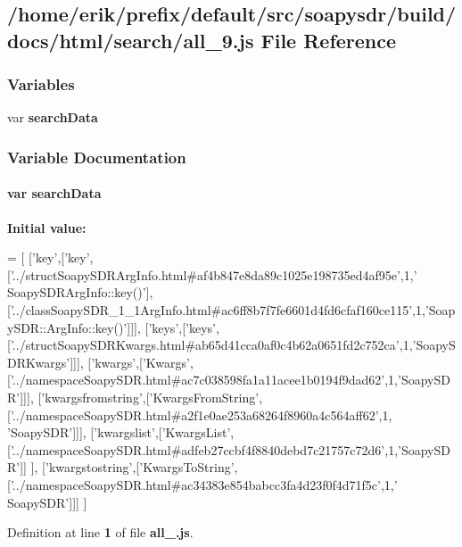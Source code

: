 \subsection{/home/erik/prefix/default/src/soapysdr/build/docs/html/search/all\+\_\+9.js File Reference}
\label{all__9_8js}
\subsubsection*{Variables}
\begin{DoxyCompactItemize}
\item 
var {\bf search\+Data}
\end{DoxyCompactItemize}


\subsubsection{Variable Documentation}
\paragraph[{search\+Data}]{\setlength{\rightskip}{0pt plus 5cm}var search\+Data}\label{all__9_8js_ad01a7523f103d6242ef9b0451861231e}
{\bfseries Initial value\+:}
\begin{DoxyCode}
=
[
  [\textcolor{stringliteral}{'key'},[\textcolor{stringliteral}{'key'},[\textcolor{stringliteral}{'../structSoapySDRArgInfo.html#af4b847e8da89c1025e198735ed4af95e'},1,\textcolor{stringliteral}{'
      SoapySDRArgInfo::key()'}],[\textcolor{stringliteral}{'../classSoapySDR\_1\_1ArgInfo.html#ac6ff8b7f7fe6601d4fd6cfaf160ce115'},1,\textcolor{stringliteral}{'SoapySDR::ArgInfo::key()'}]]],
  [\textcolor{stringliteral}{'keys'},[\textcolor{stringliteral}{'keys'},[\textcolor{stringliteral}{'../structSoapySDRKwargs.html#ab65d41cca0af0c4b62a0651fd2c752ca'},1,\textcolor{stringliteral}{'SoapySDRKwargs'}]]],
  [\textcolor{stringliteral}{'kwargs'},[\textcolor{stringliteral}{'Kwargs'},[\textcolor{stringliteral}{'../namespaceSoapySDR.html#ac7c038598fa1a11acee1b0194f9dad62'},1,\textcolor{stringliteral}{'SoapySDR'}]]],
  [\textcolor{stringliteral}{'kwargsfromstring'},[\textcolor{stringliteral}{'KwargsFromString'},[\textcolor{stringliteral}{'../namespaceSoapySDR.html#a2f1e0ae253a68264f8960a4c564aff62'},1,\textcolor{stringliteral}{
      'SoapySDR'}]]],
  [\textcolor{stringliteral}{'kwargslist'},[\textcolor{stringliteral}{'KwargsList'},[\textcolor{stringliteral}{'../namespaceSoapySDR.html#adfeb27ccbf4f8840debd7c21757c72d6'},1,\textcolor{stringliteral}{'SoapySDR'}]]
      ],
  [\textcolor{stringliteral}{'kwargstostring'},[\textcolor{stringliteral}{'KwargsToString'},[\textcolor{stringliteral}{'../namespaceSoapySDR.html#ac34383e854babcc3fa4d23f0f4d71f5c'},1,\textcolor{stringliteral}{'
      SoapySDR'}]]]
]
\end{DoxyCode}


Definition at line {\bf 1} of file {\bf all\+\_.\+js}.

